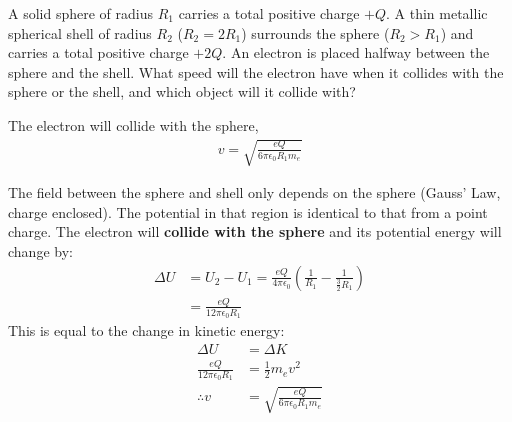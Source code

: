 \begin{solution}
\end{solution}

\question A solid sphere of radius $R_1$ carries a total positive charge $+Q$. A thin metallic spherical shell of radius $R_2$ ($R_2 = 2 R_1$) surrounds the sphere ($R_2>R_1$) and carries a total positive charge $+2Q$. An electron is placed halfway between the sphere and the shell. What speed will the electron have when it collides with the sphere or the shell, and which object will it collide with?
\begin{finalanswer}
The electron will collide with the sphere,
\begin{align*}
v=\sqrt{\frac{eQ}{6\pi\epsilon_0R_1m_e}}
\end{align*}
\end{finalanswer}
\begin{solution}
The field between the sphere and shell only depends on the sphere (Gauss’ Law, charge enclosed). The potential in that region is identical to that from a point charge. The electron will \textbf{collide with the sphere} and its potential energy will change by:
\begin{align*}
\Delta U &= U_2-U_1=\frac{eQ}{4\pi\epsilon_0}\left(\frac{1}{R_1}-\frac{1}{\frac{3}{2}R_1} \right)\\
&=\frac{eQ}{12\pi\epsilon_0R_1}
\end{align*}
This is equal to the change in kinetic energy:
\begin{align*}
\Delta U &= \Delta K\\
\frac{eQ}{12\pi\epsilon_0R_1} &= \frac{1}{2}m_ev^2\\
\therefore v &=\sqrt{\frac{eQ}{6\pi\epsilon_0R_1m_e}}
\end{align*}
\end{solution}

